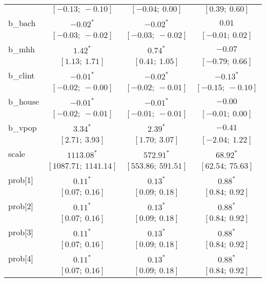\begin{table}
\begin{center}
\begin{tabular}{l c c c }
          & $[-0.13;\ -0.10]$       & $[-0.04;\ 0.00]$        & $[0.39;\ 0.60]$       \\
b\_bach   & $-0.02^{*}$             & $-0.02^{*}$             & $0.01$                \\
          & $[-0.03;\ -0.02]$       & $[-0.03;\ -0.02]$       & $[-0.01;\ 0.02]$      \\
b\_mhh    & $1.42^{*}$              & $0.74^{*}$              & $-0.07$               \\
          & $[1.13;\ 1.71]$         & $[0.41;\ 1.05]$         & $[-0.79;\ 0.66]$      \\
b\_clint  & $-0.01^{*}$             & $-0.02^{*}$             & $-0.13^{*}$           \\
          & $[-0.02;\ -0.00]$       & $[-0.02;\ -0.01]$       & $[-0.15;\ -0.10]$     \\
b\_house  & $-0.01^{*}$             & $-0.01^{*}$             & $-0.00$               \\
          & $[-0.02;\ -0.01]$       & $[-0.01;\ -0.01]$       & $[-0.01;\ 0.00]$      \\
b\_vpop   & $3.34^{*}$              & $2.39^{*}$              & $-0.41$               \\
          & $[2.71;\ 3.93]$         & $[1.70;\ 3.07]$         & $[-2.04;\ 1.22]$      \\
scale     & $1113.08^{*}$           & $572.91^{*}$            & $68.92^{*}$           \\
          & $[1087.71;\ 1141.14]$   & $[553.86;\ 591.51]$     & $[62.54;\ 75.63]$     \\
prob[1]   & $0.11^{*}$              & $0.13^{*}$              & $0.88^{*}$            \\
          & $[0.07;\ 0.16]$         & $[0.09;\ 0.18]$         & $[0.84;\ 0.92]$       \\
prob[2]   & $0.11^{*}$              & $0.13^{*}$              & $0.88^{*}$            \\
          & $[0.07;\ 0.16]$         & $[0.09;\ 0.18]$         & $[0.84;\ 0.92]$       \\
prob[3]   & $0.11^{*}$              & $0.13^{*}$              & $0.88^{*}$            \\
          & $[0.07;\ 0.16]$         & $[0.09;\ 0.18]$         & $[0.84;\ 0.92]$       \\
prob[4]   & $0.11^{*}$              & $0.13^{*}$              & $0.88^{*}$            \\
          & $[0.07;\ 0.16]$         & $[0.09;\ 0.18]$         & $[0.84;\ 0.92]$       \\

\end{tabular}
\end{center}
\end{table}
